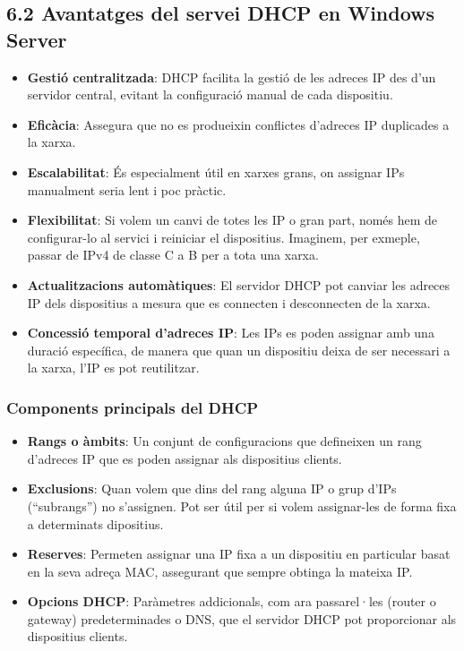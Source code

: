 \documentclass[
  a4paper,
]{article}
\providecommand{\tightlist}{%
  \setlength{\itemsep}{0pt}\setlength{\parskip}{0pt}}
\begin{document}
\subsection{6.2 Avantatges del servei DHCP en Windows
Server}\label{avantatges-del-servei-dhcp-en-windows-server}

\begin{itemize}
\tightlist
\item
  \textbf{Gestió centralitzada}: DHCP facilita la gestió de les adreces
  IP des d'un servidor central, evitant la configuració manual de cada
  dispositiu.
\item
  \textbf{Eficàcia}: Assegura que no es produeixin conflictes d'adreces
  IP duplicades a la xarxa.
\item
  \textbf{Escalabilitat}: És especialment útil en xarxes grans, on
  assignar IPs manualment seria lent i poc pràctic.
\item
  \textbf{Flexibilitat}: Si volem un canvi de totes les IP o gran part,
  només hem de configurar-lo al servici i reiniciar el dispositius.
  Imaginem, per exmeple, passar de IPv4 de classe C a B per a tota una
  xarxa.
\item
  \textbf{Actualitzacions automàtiques}: El servidor DHCP pot canviar
  les adreces IP dels dispositius a mesura que es connecten i
  desconnecten de la xarxa.
\item
  \textbf{Concessió temporal d'adreces IP}: Les IPs es poden assignar
  amb una duració específica, de manera que quan un dispositiu deixa de
  ser necessari a la xarxa, l'IP es pot reutilitzar.
\end{itemize}

\subsubsection{Components principals del
DHCP}\label{components-principals-del-dhcp}

\begin{itemize}
\item
  \textbf{Rangs o àmbits}: Un conjunt de configuracions que defineixen
  un rang d'adreces IP que es poden assignar als dispositius clients.
\item
  \textbf{Exclusions}: Quan volem que dins del rang alguna IP o grup
  d'IPs (``subrangs'') no s'assignen. Pot ser útil per si volem
  assignar-les de forma fixa a determinats dipositius.
\item
  \textbf{Reserves}: Permeten assignar una IP fixa a un dispositiu en
  particular basat en la seva adreça MAC, assegurant que sempre obtinga
  la mateixa IP.
\item
  \textbf{Opcions DHCP}: Paràmetres addicionals, com ara passarel·les
  (router o gateway) predeterminades o DNS, que el servidor DHCP pot
  proporcionar als dispositius clients.
\end{itemize}
\end{document}
